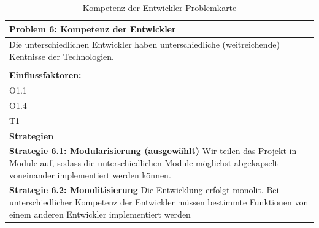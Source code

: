 \documentclass[fontsize=12pt,paper=a4,twoside]{scrartcl}
\begin{document}
\begin{table}[H]
    \centering
    \begin{tabular}{|p{15cm}|}
    \hline
          \textbf{Problem 6: Kompetenz der Entwickler}  \\ \hline
	Die unterschiedlichen Entwickler haben unterschiedliche (weitreichende) Kentnisse der Technologien. \\
         \\ \hline
          \textbf{Einflussfaktoren: } \\
	O1.1 \\
	O1.4 \\
	T1 \\
          \hline
          \textbf{Strategien} \\ \hline
            {}          
           \label{strategie:6.1}     
          \textbf{Strategie 6.1: Modularisierung (ausgewählt)} Wir teilen das Projekt in Module auf, sodass die unterschiedlichen Module möglichst abgekapselt voneinander implementiert werden können. \\        
  {}          
           \label{strategie:6.2}              
          \textbf{Strategie 6.2: Monolitisierung} Die Entwicklung erfolgt monolit. Bei unterschiedlicher Kompetenz der Entwickler müssen bestimmte Funktionen von einem anderen Entwickler implementiert werden \\
          \hline
    \end{tabular}

    \caption{Kompetenz der Entwickler Problemkarte}
    \label{tab:ProblemKarte6}
\end{table}
\end{document}
